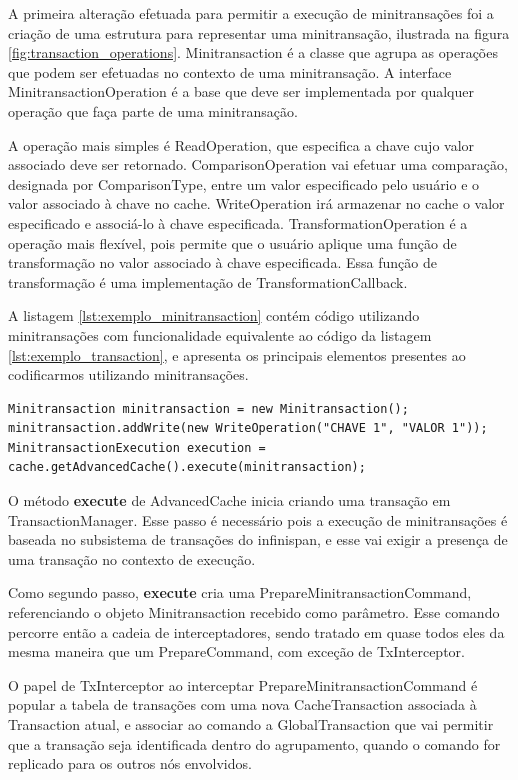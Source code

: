 \documentclass[11pt,twoside,a4paper]{book}
\begin{document}
A primeira alteração efetuada para permitir a execução de minitransações foi a criação de uma estrutura para representar uma minitransação, ilustrada na figura \ref{fig:transaction_operations}. Minitransaction é a classe que agrupa as operações que podem ser efetuadas no contexto de uma minitransação. A interface MinitransactionOperation é a base que deve ser implementada por qualquer operação que faça parte de uma minitransação.

A operação mais simples é ReadOperation, que especifica a chave cujo valor associado deve ser retornado. ComparisonOperation vai efetuar uma comparação, designada por ComparisonType, entre um valor especificado pelo usuário e o valor associado à chave no cache. WriteOperation irá armazenar no cache o valor especificado e associá-lo à chave especificada. TransformationOperation é a operação mais flexível, pois permite que o usuário aplique uma função de transformação no valor associado à chave especificada. Essa função de transformação é uma implementação de TransformationCallback.

A listagem \ref{lst:exemplo_minitransaction} contém código utilizando minitransações com funcionalidade equivalente ao código da listagem \ref{lst:exemplo_transaction}, e apresenta os principais elementos presentes ao codificarmos utilizando minitransações.

\begin{lstlisting}[caption={Minitransação}, label=lst:exemplo_minitransaction]
Minitransaction minitransaction = new Minitransaction();
minitransaction.addWrite(new WriteOperation("CHAVE 1", "VALOR 1"));
MinitransactionExecution execution = cache.getAdvancedCache().execute(minitransaction);
\end{lstlisting}

O método \textbf{execute} de AdvancedCache inicia criando uma transação em TransactionManager. Esse passo é necessário pois a execução de minitransações é baseada no subsistema de transações do infinispan, e esse vai exigir a presença de uma transação no contexto de execução.

Como segundo passo, \textbf{execute} cria uma PrepareMinitransactionCommand, referenciando o objeto Minitransaction recebido como parâmetro. Esse comando percorre então a cadeia de interceptadores, sendo tratado em quase todos eles da mesma maneira que um PrepareCommand, com exceção de TxInterceptor.

O papel de TxInterceptor ao interceptar PrepareMinitransactionCommand é popular a tabela de transações com uma nova CacheTransaction associada à Transaction atual, e associar ao comando a GlobalTransaction que vai permitir que a transação seja identificada dentro do agrupamento, quando o comando for replicado para os outros nós envolvidos.
\end{document}
